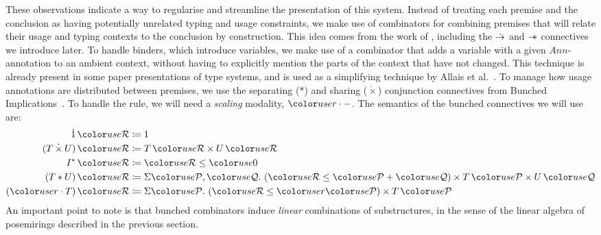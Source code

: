These observations indicate a way to regularise and streamline the
presentation of this system. Instead of treating each premise and the
conclusion as having potentially unrelated typing and usage
constraints, we make use of combinators for combining premises that will
relate their usage and typing contexts to the conclusion by
construction.
This idea comes from the work of \citet{RPKV20}, including the $\mathrel{\dot\to}$ and
$\mathrel{\mathord{-}\hspace{-0.75ex}*}$ connectives we introduce later.
To handle binders, which introduce variables, we make
use of a combinator that adds a variable with a given $Ann$-annotation
to an ambient context, without having to explicitly mention the parts
of the context that have not changed. This technique is already
present in some paper presentations of type systems, and is used as a
simplifying technique by Allais et al.~\cite{AACMM21}.
To manage how usage annotations are distributed between premises, we use the
separating ($*$) and sharing ($\dot{\times}$) conjunction connectives from
Bunched Implications~\cite{oHP99}.
To handle the  rule, we will need a
\emph{scaling} modality, $\gr r \cdot {-}$. The semantics of the bunched
connectives we will use are:
  \begin{align*}
    \dot1\,\grR &\coloneqq 1 \\
    (T \dottimes U)\,\grR &\coloneqq T\,\grR \times U\,\grR \\
    I^*\,\grR &\coloneqq \grR \leq \gr0 \\
    (T \sep U)\,\grR &\coloneqq \Sigma \grP,\grQ.~\plr{\grR \leq \grP + \grQ}
                       \times T\,\grP \times U\,\grQ \\
    (\gr r \cdot T)\,\grR &\coloneqq \Sigma \grP.~\plr{\grR \leq \gr r\grP}
                       \times T\,\grP \\
  \end{align*}
An important point to note is that bunched combinators induce
\emph{linear} combinations of substructures, in the sense of the
linear algebra of posemirings described in the previous section.

